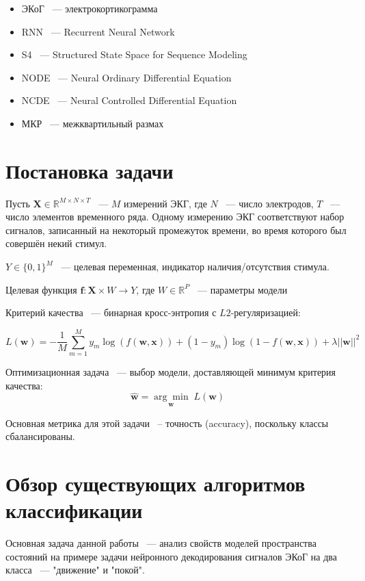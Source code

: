 \documentclass[a4paper, 12pt]{article}
\newcommand{\bx}{\mathbf{x}}
\newcommand{\bw}{\mathbf{w}}
\newcommand{\bff}{\mathbf{f}}
\newcommand{\bX}{\mathbf{X}}
\newcommand{\dR}{\mathds{R}}
\begin{document}
	\begin{itemize}
		\item ЭКоГ ~--- электрокортикограмма
		\item RNN ~--- Recurrent Neural Network
		\item S4 ~--- Structured State Space for Sequence Modeling
		\item NODE ~--- Neural Ordinary Differential Equation
		\item NCDE ~--- Neural Controlled Differential Equation
		\item МКР ~--- межквартильный размах
	\end{itemize}
	
	\newpage
	\section{Постановка задачи}
	
	Пусть $\bX \in \dR^{M \times N \times T}$ ~--- $M$ измерений ЭКГ, где $N$ ~--- число электродов, $T$ ~--- число элементов временного ряда. Одному измерению ЭКГ соответствуют набор сигналов, записанный на некоторый промежуток времени, во время которого был совершён некий стимул.
	
	$Y \in \{ 0, 1\}^M$ ~--- целевая переменная, индикатор наличия/отсутствия стимула.
	
	Целевая функция $ \bff: \bX \times W \to Y$, где $W \in \dR^P$ ~--- параметры модели
	
	Критерий качества ~--- бинарная кросс-энтропия с $L2$-регуляризацией:  
	
	$$ L(\bw) = -\dfrac{1}{M} \sum\limits_{m=1}^M y_m \log(f(\bw, \bx)) + (1 - y_m) \log(1 - f(\bw, \bx)) + \lambda ||\bw||^2$$
	
	Оптимизационная задача ~--- выбор модели, доставляющей минимум критерия качества: $$\hat{\bw} = \underset{\bw}{\arg \min} \; L(\bw)$$
	
	Основная метрика для этой задачи ~-- точность (accuracy), поскольку классы сбалансированы.
	\newpage
	\section{Обзор существующих алгоритмов классификации}
	Основная задача данной работы ~--- анализ свойств моделей пространства состояний на примере задачи нейронного декодирования сигналов ЭКоГ на два класса ~--- "движение" и "покой". 
	
\end{document}
